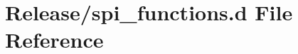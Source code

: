 \hypertarget{spi__functions_8d}{}\section{Release/spi\+\_\+functions.d File Reference}
\label{spi__functions_8d}
